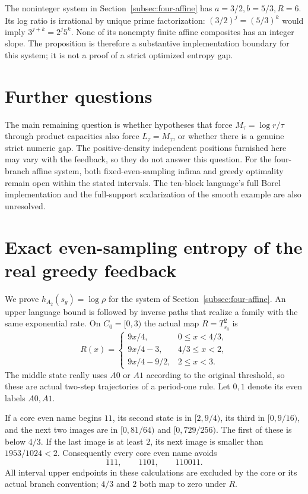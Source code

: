\documentclass[11pt,reqno]{amsart}
\numberwithin{equation}{section}
\theoremstyle{definition}
\begin{document}
The noninteger system in Section~\ref{subsec:four-affine} has
$a=3/2,b=5/3,R=6$. Its log ratio is irrational by unique prime
factorization: $(3/2)^j=(5/3)^k$ would imply
$3^{j+k}=2^j5^k$. None of its nonempty finite affine composites
has an integer slope. The proposition is therefore a substantive
implementation boundary for this system; it is not a proof of a
strict optimized entropy gap.

\section{Further questions}\label{app:scope}
The main remaining question is whether hypotheses that force
$M_\tau=\log r/\tau$ through product capacities also force
$L_\tau=M_\tau$, or whether there is a genuine strict numeric gap.
The positive-density independent positions furnished here may vary
with the feedback, so they do not answer this question. For the
four-branch affine system, both fixed-even-sampling infima and greedy
optimality remain open within the stated intervals. The ten-block
language's full Borel implementation and the full-support scalarization
of the smooth example are also unresolved.


\appendix

\section{Exact even-sampling entropy of the real greedy feedback}
\label{app:greedy}

We prove $h_{A_2}(s_g)=\log\rho$ for the system of
Section~\ref{subsec:four-affine}. An upper language bound is followed by
inverse paths that realize a family with the same exponential rate.
On $C_0=[0,3)$ the actual map $R=T_{s_g}^2$ is
\begin{equation}\label{eq:greedy-R}
 R(x)=\begin{cases}
 9x/4,&0\le x<4/3,\\
 9x/4-3,&4/3\le x<2,\\
 9x/4-9/2,&2\le x<3.
 \end{cases}
\end{equation}
The middle state really uses $A0$ or $A1$ according to the original
threshold, so these are actual two-step trajectories of a period-one
rule. Let $0,1$ denote its even labels $A0,A1$.

If a core even name begins $11$, its second state is in
$[2,9/4)$, its third in $[0,9/16)$, and the next two images
are in $[0,81/64)$ and $[0,729/256)$. The first of these
is below $4/3$. If the last image is at least $2$, its next
image is smaller than $1953/1024<2$.
Consequently every core even name avoids
\begin{equation}\label{eq:greedy-forbidden}
 111,\qquad1101,\qquad110011.
\end{equation}
All interval upper endpoints in these calculations are excluded by
the core or its actual branch convention; $4/3$ and $2$ both
map to zero under $R$.
\end{document}
